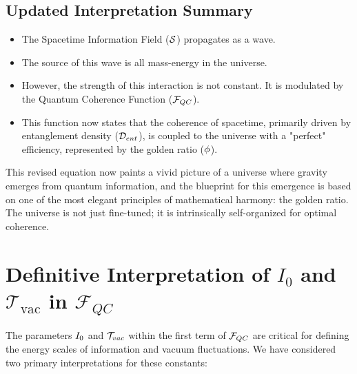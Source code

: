 \subsection*{Updated Interpretation Summary}
\begin{itemize}[noitemsep]
    \item The Spacetime Information Field ($\mathcal{S}$) propagates as a wave.
    \item The source of this wave is all mass-energy in the universe.
    \item However, the strength of this interaction is not constant. It is modulated by the Quantum Coherence Function ($\mathcal{F}_{QC}$).
    \item This function now states that the coherence of spacetime, primarily driven by entanglement density ($\mathcal{D}_{ent}$), is coupled to the universe with a "perfect" efficiency, represented by the golden ratio ($\phi$).
\end{itemize}
This revised equation now paints a vivid picture of a universe where gravity emerges from quantum information, and the blueprint for this emergence is based on one of the most elegant principles of mathematical harmony: the golden ratio. The universe is not just fine-tuned; it is intrinsically self-organized for optimal coherence.

\section{Definitive Interpretation of $I_0$ and $\mathcal{T}_{\text{vac}}$ in $\mathcal{F}_{QC}$}
The parameters $I_0$ and $\mathcal{T}_{vac}$ within the first term of $\mathcal{F}_{QC}$ are critical for defining the energy scales of information and vacuum fluctuations. We have considered two primary interpretations for these constants:

